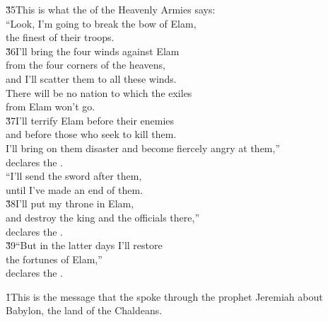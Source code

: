 \begin{poetry}
\poeml \v{35}This is what the  of the Heavenly Armies says: \\
\poeml ``Look, I'm going to break the bow of Elam, \\
\poemll    the finest of their troops. \\
\poeml \v{36}I'll bring the four winds against Elam \\
\poemll    from the four corners of the heavens, \\
\poeml and I'll scatter them to all these winds. \\
\poemll    There will be no nation to which the exiles \\
\poemlll       from Elam won't go. \\
\poeml \v{37}I'll terrify Elam before their enemies \\
\poemll    and before those who seek to kill them. \\
\poeml I'll bring on them disaster and become fiercely angry at them,'' \\
\poemll    declares the . \\
\poeml ``I'll send the sword after them, \\
\poemll    until I've made an end of them. \\
\poeml \v{38}I'll put my throne in Elam, \\
\poemll    and destroy the king and the officials there,'' \\
\poemlll       declares the . \\
\poeml \v{39}``But in the latter days I'll restore \\
\poemll    the fortunes of Elam,'' \\
\poemlll       declares the .
\end{poetry}

\v{1}This is the message that the  spoke through the prophet Jeremiah about Babylon, the land of the Chaldeans.

